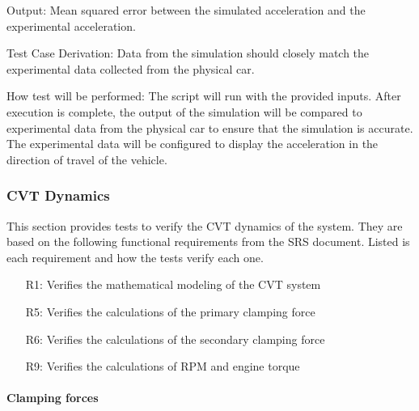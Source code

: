 \documentclass[12pt, titlepage]{article}
\begin{document}
\begin{enumerate}
  Output: Mean squared error between the simulated acceleration and the experimental acceleration.

  Test Case Derivation: Data from the simulation should closely match the experimental data collected from the physical car.

  How test will be performed: The script will run with the provided inputs. After execution is complete, the output of the simulation will be compared to experimental data from the physical car to ensure that the simulation is accurate. The experimental data will be configured to display the acceleration in the direction of travel of the vehicle.

\end{enumerate}

\subsubsection{CVT Dynamics}

This section provides tests to verify the CVT dynamics of the system.
They are based on the following functional requirements from the SRS document.
Listed is each requirement and how the tests verify each one.
\begin{itemize}
  \item [R1:] Verifies the mathematical modeling of the CVT system
  \item [R5:] Verifies the calculations of the primary clamping force
  \item [R6:] Verifies the calculations of the secondary clamping force
  \item [R9:] Verifies the calculations of RPM and engine torque
\end{itemize}

\paragraph{Clamping forces}
\end{document}
